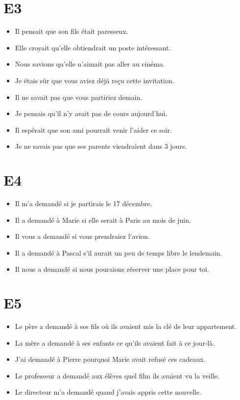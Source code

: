 \documentclass{book}
\begin{document}
    \section{E3}
        \begin{itemize}
            \item Il pensait que son fils était paresseux.
            \item Elle croyait qu'elle obtiendrait un poste intéressant.
            \item Nous savions qu'elle n'aimait pas aller au cinéma.
            \item Je étais sûr que vous aviez déjà reçu cette invitation.
            \item Il ne savait pas que vous partiriez demain.
            \item Je pensais qu'il n'y avait pas de cours aujourd'hui.
            \item Il espérait que son ami pourrait venir l'aider ce soir.
            \item Je ne savais pas que ses parents viendraient dans 3 jours.
        \end{itemize}

    \section{E4}
        \begin{itemize}
            \item Il m'a demandé si je partirais le 17 décembre.
            \item Il a demandé à Marie si elle serait à Paris au mois de juin.
            \item Il vous a demandé si vous prendraiez l'avion.
            \item Il a demandé à Pascal s'il aurait un peu de temps libre le lendemain.
            \item Il nous a demandé si nous pouraions réserver une place pour toi.
        \end{itemize}

    \section{E5}
        \begin{itemize}
            \item Le père a demandé à ses fils où ils avaient mis la clé de leur appartement.
            \item La mère a demandé à ses enfants ce qu'ils avaient fait à ce jour-là.
            \item J'ai demandé à Pierre pourquoi Marie avait refusé ces cadeaux.
            \item Le professeur a demandé aux élèves quel film ils avaient vu la veille.
            \item Le directeur m'a demandé quand j'avais appris cette nouvelle.
        \end{itemize}
\end{document}

